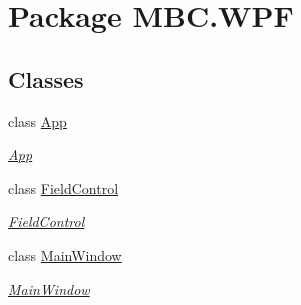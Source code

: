 \hypertarget{namespace_m_b_c_1_1_w_p_f}{\section{Package M\-B\-C.\-W\-P\-F}
\label{namespace_m_b_c_1_1_w_p_f}
}
\subsection*{Classes}
\begin{DoxyCompactItemize}
\item 
class \hyperlink{class_m_b_c_1_1_w_p_f_1_1_app}{App}
\begin{DoxyCompactList}\small\item\em \hyperlink{class_m_b_c_1_1_w_p_f_1_1_app}{App} \end{DoxyCompactList}\item 
class \hyperlink{class_m_b_c_1_1_w_p_f_1_1_field_control}{Field\-Control}
\begin{DoxyCompactList}\small\item\em \hyperlink{class_m_b_c_1_1_w_p_f_1_1_field_control}{Field\-Control} \end{DoxyCompactList}\item 
class \hyperlink{class_m_b_c_1_1_w_p_f_1_1_main_window}{Main\-Window}
\begin{DoxyCompactList}\small\item\em \hyperlink{class_m_b_c_1_1_w_p_f_1_1_main_window}{Main\-Window} \end{DoxyCompactList}\end{DoxyCompactItemize}

